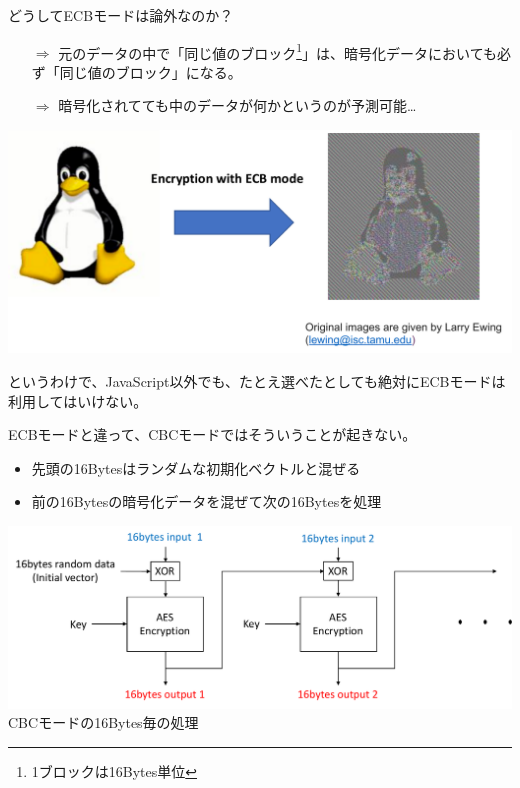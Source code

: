 \documentclass[12pt,dvipdfmx]{beamer}
\begin{document}
\begin{frame}
どうしてECBモードは論外なのか？
\begin{itemize}
 \item[$\Rightarrow$] 元のデータの中で「同じ値のブロック\footnote[frame]{1ブロックは16Bytes単位}」は、暗号化データにおいても必ず「同じ値のブロック」になる。
 \item[$\Rightarrow$] \alert{暗号化されてても中のデータが何かというのが予測可能…}
\end{itemize}
\begin{center}
\includegraphics[width=0.8\linewidth]{Figs/ecb_mode.pdf}
\end{center}

というわけで、JavaScript以外でも、たとえ選べたとしても絶対にECBモードは利用してはいけない。
\end{frame}

\begin{frame}
ECBモードと違って、CBCモードではそういうことが起きない。
\begin{itemize}
 \item 先頭の16Bytesはランダムな初期化ベクトルと混ぜる
 \item 前の16Bytesの暗号化データを混ぜて次の16Bytesを処理
\end{itemize}

\vspace{2ex}

\begin{center}
\includegraphics[width=0.8\linewidth]{Figs/cbc_mode.pdf}\\
CBCモードの16Bytes毎の処理
\end{center}
\end{frame}
\end{document}
